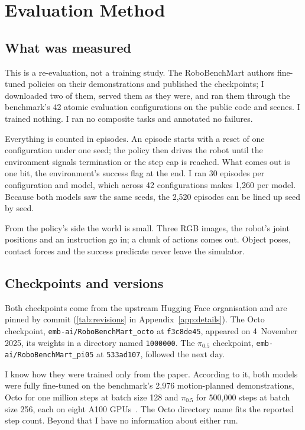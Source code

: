 \chapter{Evaluation Method}
\label{chap:methodology}
\begingroup
\justifying
\setlength{\parindent}{2em}
\setlength{\parskip}{0.55\baselineskip}

\section{What was measured}
\label{sec:study-design}

This is a re-evaluation, not a training study. The RoboBenchMart authors fine-tuned policies on their demonstrations and published the checkpoints; I downloaded two of them, served them as they were, and ran them through the benchmark's 42 atomic evaluation configurations on the public code and scenes. I trained nothing. I ran no composite tasks and annotated no failures.

Everything is counted in episodes. An episode starts with a reset of one configuration under one seed; the policy then drives the robot until the environment signals termination or the step cap is reached. What comes out is one bit, the environment's success flag at the end. I ran 30 episodes per configuration and model, which across 42 configurations makes 1,260 per model. Because both models saw the same seeds, the 2,520 episodes can be lined up seed by seed.

From the policy's side the world is small. Three RGB images, the robot's joint positions and an instruction go in; a chunk of actions comes out. Object poses, contact forces and the success predicate never leave the simulator.

\section{Checkpoints and versions}
\label{sec:versions}

Both checkpoints come from the upstream Hugging Face organisation and are pinned by commit (\ref{tab:revisions} in Appendix~\ref{app:details}). The Octo checkpoint, \texttt{emb-ai/RoboBenchMart\_octo} at \texttt{f3c8de45}, appeared on 4~November 2025, its weights in a directory named \texttt{1000000}. The $\pi_{0.5}$ checkpoint, \texttt{emb-ai/RoboBenchMart\_pi05} at \texttt{533ad107}, followed the next day.

I know how they were trained only from the paper. According to it, both models were fully fine-tuned on the benchmark's 2,976 motion-planned demonstrations, Octo for one million steps at batch size 128 and $\pi_{0.5}$ for 500,000 steps at batch size 256, each on eight A100 GPUs~\cite{soshin2025robobenchmart}. The Octo directory name fits the reported step count. Beyond that I have no information about either run.

